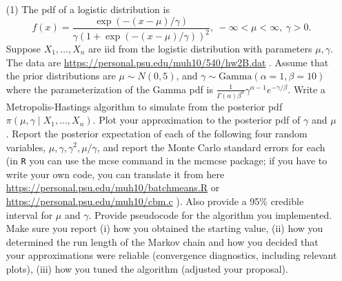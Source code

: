 \documentclass[10pt]{article}
\begin{document}
\begin{enumerate}
\item[(1)] The pdf of a logistic distribution is 
 $$f(x) = \frac{\exp(-(x-\mu)/\gamma) } {\gamma (1 + \exp(-(x-\mu)/\gamma))^2},\:
 -\infty <\mu < \infty,\: \gamma>0.$$
 Suppose $X_1,\dots, X_n$ are iid from the logistic distribution with
 parameters $\mu, \gamma$. The data are
 \url{https://personal.psu.edu/muh10/540/hw2B.dat} . Assume that the
 prior distributions are $\mu \sim N(0,5)$, and
 $\gamma \sim \mbox{Gamma}(\alpha=1,\beta=10)$ where the
 parameterization of the Gamma pdf is
 $\frac{1}{\Gamma(\alpha) \beta^\alpha} \gamma^{\alpha-1}
 e^{-\gamma/\beta}.$
 Write a Metropolis-Hastings algorithm to simulate from the posterior
 pdf $\pi(\mu, \gamma\mid X_1,\dots,X_n)$. Plot your approximation to
 the posterior pdf of $\gamma$ and $\mu$. Report the posterior
 expectation of each of the following four random variables,
 $\mu, \gamma, \gamma^2, \mu/\gamma$, and report the Monte Carlo
 standard errors for each (in {\tt R} you can use the mcse command in
 the mcmcse package; if you have to write your own code, you can
 translate it from here
 \url{https://personal.psu.edu/muh10/batchmeans.R} or
 \url{https://personal.psu.edu/muh10/cbm.c} ). Also provide a 95\%
 credible interval for $\mu$ and $\gamma$. Provide pseudocode for the
 algorithm you implemented. Make sure you report (i) how you obtained
 the starting value, (ii) how you determined the run length of the
 Markov chain and how you decided that your approximations were
 reliable (convergence diagnostics, including relevant plots), (iii)
 how you tuned the algorithm (adjusted your proposal).


\end{enumerate}
\end{document}
